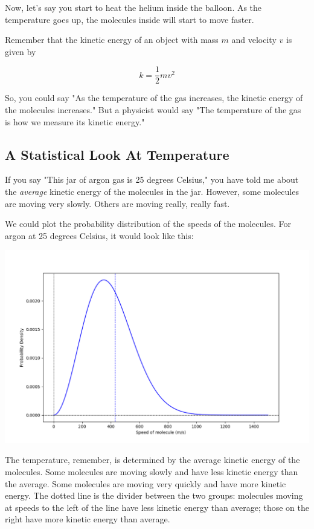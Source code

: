 Now,  let's say you start to heat the helium inside the balloon.  As the temperature goes up,  the molecules inside will start to move faster.

Remember that the kinetic energy of an object with mass $m$ and velocity $v$ is given by

$$k = \frac{1}{2} m v^2$$

So, you could say "As the temperature of the gas increases,  the kinetic energy of the molecules increases."   But a physicist would say "The temperature of the gas is how we measure its kinetic energy."

\subsection{A Statistical Look At Temperature}

If you say "This jar of argon gas is 25 degrees Celsius,"  you have told me about the \emph{average} kinetic energy of the molecules in the jar.  
However,  some molecules are moving very slowly.  Others are moving really,  really fast. 

We could plot the probability distribution of the speeds of the molecules.  For argon at 25 degrees Celsius,  it would look like this:

\includegraphics[width=\textwidth]{ar_plot.png}

The temperature,  remember,  is determined by the average kinetic energy of the molecules.  Some molecules are moving slowly and have less kinetic energy than the average.  Some molecules are moving very quickly and have more kinetic energy.  The dotted line is the divider between the two groups: molecules moving at speeds to the left of the line have less kinetic energy than average; those on the right have more kinetic energy than average.

